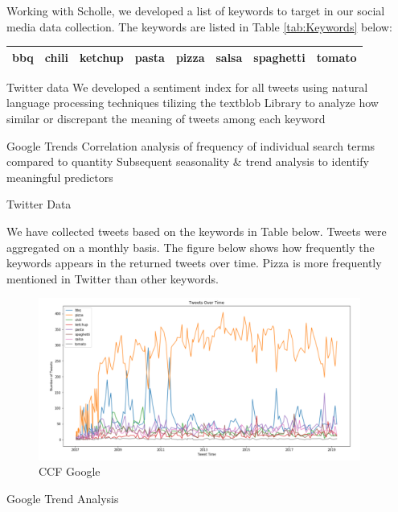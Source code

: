 \documentclass[12pt,oneside]{chicagocapstone}
\begin{document}
Working with Scholle, we developed a list of keywords to target in our
social media data collection. The keywords are listed in Table
\ref{tab:Keywords} below:
\begin{longtable}[]{@{}cccccccc@{}}
\toprule
bbq & chili & ketchup & pasta & pizza & salsa & spaghetti &
tomato\tabularnewline
\bottomrule
\end{longtable}
Twitter data We developed a sentiment index for all tweets using natural
language processing techniques tilizing the textblob Library to analyze
how similar or discrepant the meaning of tweets among each keyword

Google Trends Correlation analysis of frequency of individual search
terms compared to quantity Subsequent seasonality \& trend analysis to
identify meaningful predictors

Twitter Data

We have collected tweets based on the keywords in Table below. Tweets
were aggregated on a monthly basis. The figure below shows how
frequently the keywords appears in the returned tweets over time. Pizza
is more frequently mentioned in Twitter than other keywords.
\begin{figure}

{\centering \includegraphics[width=400px]{figure/twitter-time} 

}

\caption{CCF Google}\label{fig:twitter-time}
\end{figure}
Google Trend Analysis
\end{document}
